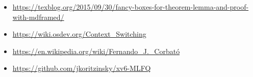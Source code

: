 \documentclass{report}
\begin{document}
\begin{itemize}
    \item \url{https://texblog.org/2015/09/30/fancy-boxes-for-theorem-lemma-and-proof-with-mdframed/}
    \item \url{https://wiki.osdev.org/Context_Switching}
    \item \url{https://en.wikipedia.org/wiki/Fernando_J._Corbató}
    \item \url{https://github.com/jkoritzinsky/xv6-MLFQ}
\end{itemize}
\end{document}

